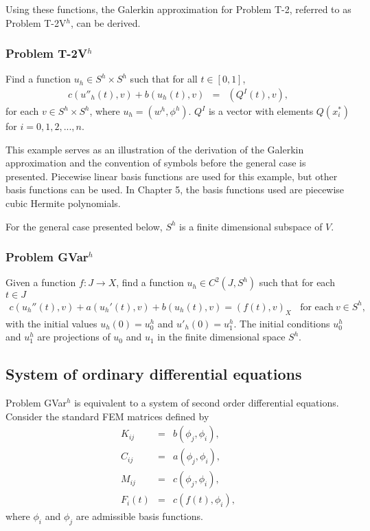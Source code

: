 \documentclass[../../main.tex]{subfiles}
\begin{document}
Using these functions, the Galerkin approximation for Problem T-2, referred to as Problem T-2V$^h$, can be derived.

\subsubsection{Problem T-2V$^h$}
Find a function $u_h \in S^h\times S^h$ such that for all $t \in [0,1]$,
\begin{eqnarray*}
	c(u''_h(t),v) + b(u_h(t),v) & = & (Q^I(t),v),
\end{eqnarray*} for each $v \in S^h\times S^h$, where $u_h = ( w^h, \phi^h )$. $Q^I$ is a vector with elements $Q(x^*_i)$ for $i = 0,1,2,...,n$.

This example serves as an illustration of the derivation of the Galerkin approximation and the convention of symbols before the general case is presented. Piecewise linear basis functions are used for this example, but other basis functions can be used. In Chapter 5, the basis functions used are piecewise cubic Hermite polynomials.

For the general case presented below, $S^h$ is a finite dimensional subspace of $V$.

\subsubsection*{Problem GVar$^h$}
Given a function $f: J \rightarrow X$, find a function $u_h \in C^2(J, S^h)$ such that for each $t\in J$
\begin{eqnarray}
	c(u_h''(t),v)+a(u_h'(t),v)+b(u_h(t),v)= (f(t),v)_{X} \ \ \ \ \textrm{for each} \ v \in S^h, \label{DC_E2}
\end{eqnarray}
with the initial values $u_h(0)=u^h_{0}$ and $u'_h(0)=u^h_{1}$. The initial conditions $u^h_{0}$ and $u^h_{1}$ are projections of $u_0$ and $u_1$ in the finite dimensional space $S^h$.

\subsection{System of ordinary differential equations}
Problem GVar$^h$ is equivalent to a system of second order differential equations. Consider the standard FEM matrices defined by
\begin{eqnarray*}
	K_{ij} & = & b(\phi_j, \phi_i),\\
	C_{ij} & = & a(\phi_j, \phi_i),\\
	M_{ij} & = & c(\phi_j, \phi_i),\\
	F_{i}(t) & = & c(f(t), \phi_i),
\end{eqnarray*} where $\phi_i$ and $\phi_j$ are admissible basis functions.
\end{document}
